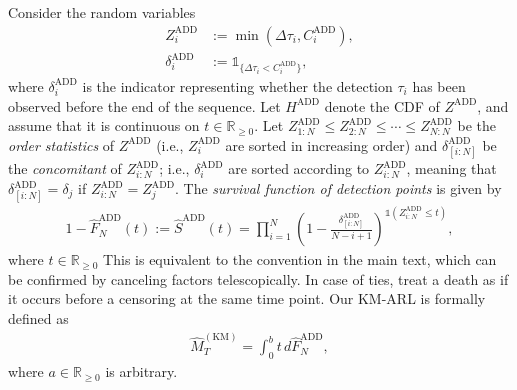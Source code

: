 \documentclass{article}
\theoremstyle{plain}
\theoremstyle{definition}
\theoremstyle{remark}
\def\mbr{\mathbb{R}}
\def\mbone{\mathds{1}}
\begin{document}
Consider the random variables
\begin{align}
  Z_i^\mathrm{ADD}   &:= \min(\Delta\tau_i,C_i^\mathrm{ADD}),\\
  \delta_i^\mathrm{ADD} &:= \mbone_{\{\Delta\tau_i<C_i^\mathrm{ADD}\}},
\end{align}
where $\delta_i^\mathrm{ADD}$ is the indicator representing whether the detection $\tau_i$ has been observed before the end of the sequence.  
Let $H^\mathrm{ADD}$ denote the CDF of $Z^\mathrm{ADD}$, and assume that it is continuous on $t \in \mbr_{\geq 0}$.
Let $Z_{1:N}^\mathrm{ADD} \leq Z_{2:N}^\mathrm{ADD} \leq \cdots\le Z_{N:N}^\mathrm{ADD}$ be the \textit{order statistics} of $Z^\mathrm{ADD}$  (i.e., $Z_i^\mathrm{ADD}$ are sorted in increasing order) and  
$\delta_{[i:N]}^\mathrm{ADD}$ be the \textit{concomitant} of $Z_{i:N}^\mathrm{ADD}$; i.e., $\delta_i^\mathrm{ADD}$ are sorted according to $Z_{i:N}^\mathrm{ADD}$, meaning that $\delta_{[i:N]}^\mathrm{ADD}=\delta_j$ if $Z_{i:N}^\mathrm{ADD}=Z_j^\mathrm{ADD}$. The \textit{survival function of detection points} is given by
\begin{align}
    1 - \hat{F}_N^\mathrm{ADD}(t) := \hat{S}^\mathrm{ADD}(t) = \prod_{i=1}^N(1 - \frac{\delta_{[i:N]}^\mathrm{ADD}}{N - i + 1})^{\mbone(Z_{i:N}^\mathrm{ADD} \leq t)},
\end{align}
where $t \in \mbr_{\geq0}$
This is equivalent to the convention in the main text, which can be confirmed by canceling factors telescopically. In case of ties, treat a death as if it occurs before a censoring at the same time point.
Our KM-ARL is formally defined as
\begin{align}
    \hat{M}_T^\mathrm{(KM)} = \int_0^{b}  t \, d\hat{F}_N^\mathrm{ADD},
\end{align}
where $a \in \mbr_{\geq0}$ is arbitrary.
\end{document}
